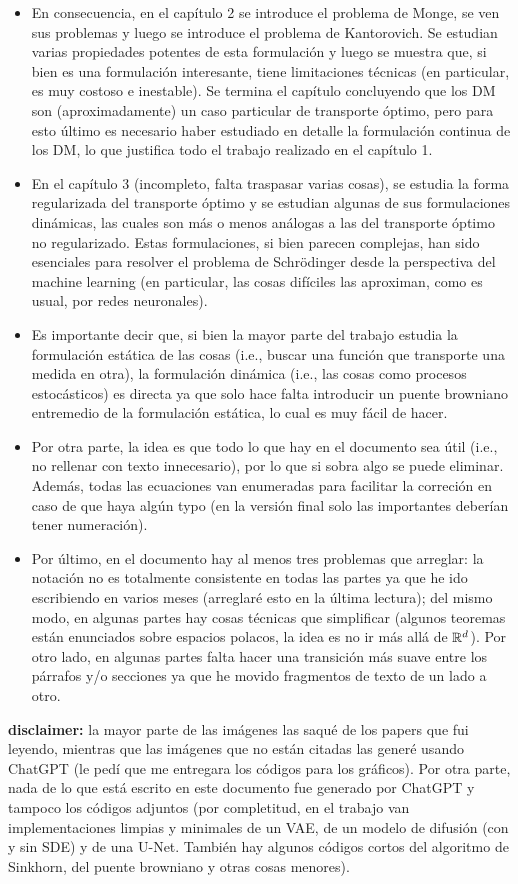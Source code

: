 \begin{itemize}
    \item En consecuencia, en el capítulo 2 se introduce el problema de Monge, se ven sus problemas y luego se introduce el problema de Kantorovich. Se estudian varias propiedades potentes de esta formulación y luego se muestra que, si bien es una formulación interesante, tiene limitaciones técnicas (en particular, es muy costoso e inestable). Se termina el capítulo concluyendo que los DM son (aproximadamente) un caso particular de transporte óptimo, pero para esto último es necesario haber estudiado en detalle la formulación continua de los DM, lo que justifica todo el trabajo realizado en el capítulo 1.
    \item En el capítulo 3 (incompleto, falta traspasar varias cosas), se estudia la forma regularizada del transporte óptimo y se estudian algunas de sus formulaciones dinámicas, las cuales son más o menos análogas a las del transporte óptimo no regularizado. Estas formulaciones, si bien parecen complejas, han sido esenciales para resolver el problema de Schrödinger desde la perspectiva del machine learning (en particular, las cosas difíciles las aproximan, como es usual, por redes neuronales).
    \item Es importante decir que, si bien la mayor parte del trabajo estudia la formulación estática de las cosas (i.e., buscar una función que transporte una medida en otra), la formulación dinámica (i.e., las cosas como procesos estocásticos) es directa ya que solo hace falta introducir un puente browniano entremedio de la formulación estática, lo cual es muy fácil de hacer.
    \item Por otra parte, la idea es que todo lo que hay en el documento sea útil (i.e., no rellenar con texto innecesario), por lo que si sobra algo se puede eliminar. Además, todas las ecuaciones van enumeradas para facilitar la correción en caso de que haya algún typo (en la versión final solo las importantes deberían tener numeración).
    \item Por último, en el documento hay al menos tres problemas que arreglar: la notación no es totalmente consistente en todas las partes ya que he ido escribiendo en varios meses (arreglaré esto en la última lectura); del mismo modo, en algunas partes hay cosas técnicas que simplificar (algunos teoremas están enunciados sobre espacios polacos, la idea es no ir más allá de $\mathbb{R}^d$). Por otro lado, en algunas partes falta hacer una transición más suave entre los párrafos y/o secciones ya que he movido fragmentos de texto de un lado a otro.
\end{itemize}

\textbf{disclaimer:} la mayor parte de las imágenes las saqué de los papers que fui leyendo, mientras que las imágenes que no están citadas las generé usando ChatGPT (le pedí que me entregara los códigos para los gráficos). Por otra parte, nada de lo que está escrito en este documento fue generado por ChatGPT y tampoco los códigos adjuntos (por completitud, en el trabajo van implementaciones limpias y minimales de un VAE, de un modelo de difusión (con y sin SDE) y de una U-Net. También hay algunos códigos cortos del algoritmo de Sinkhorn, del puente browniano y otras cosas menores).